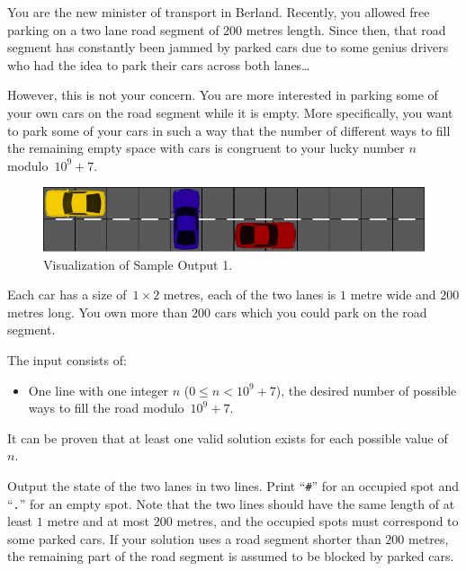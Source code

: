 \problemname{\problemyamlname}
%
You are the new minister of transport in Berland.
Recently, you allowed free parking on a two lane road segment of $200$ metres length.
Since then, that road segment has constantly been jammed by parked cars due to some
genius drivers who had the idea to park their cars across both lanes\dots

However, this is not your concern.
You are more interested in parking some of your own cars on the road segment while it is empty.
More specifically, you want to park some of your cars in such a way that the number of different ways to fill the remaining empty space with cars is congruent to your lucky number $n$ modulo~$10^9+7$.


\begin{figure}[h]
	\centering
	\includegraphics{sample}
	\caption{Visualization of Sample Output 1.}
\end{figure}

Each car has a size of~$1\times2$ metres, each of the two lanes is $1$ metre wide and $200$ metres long.
You own more than $200$ cars which you could park on the road segment.

\begin{Input}
	The input consists of:
	\begin{itemize}
		\item One line with one integer $n$ ($0\leq n<10^9+7$), the desired number of possible ways to fill the road modulo~$10^9+7$.
	\end{itemize}
	It can be proven that at least one valid solution exists for each possible value of~$n$.
\end{Input}

\begin{Output}
	Output the state of the two lanes in two lines.
	Print ``\texttt{\#}'' for an occupied spot and ``\texttt{.}'' for an empty spot.
	Note that the two lines should have the same length of at least $1$ metre and at most $200$ metres,
        and the occupied spots must correspond to some parked cars.
	If your solution uses a road segment shorter than $200$ metres,
        the remaining part of the road segment is assumed to be blocked by parked cars. 
\end{Output}
